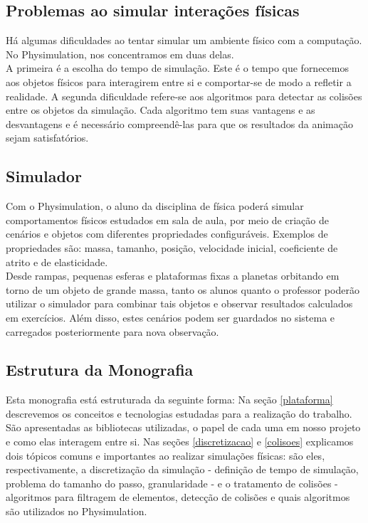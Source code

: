 \subsection{Problemas ao simular interações físicas}
Há algumas dificuldades ao tentar simular um ambiente físico com a computação. No Physimulation, nos concentramos em duas delas.\\

A primeira é a escolha do tempo de simulação. Este é o tempo que fornecemos aos objetos físicos para interagirem entre si e comportar-se de modo a refletir a realidade. A segunda dificuldade refere-se aos algoritmos para detectar as colisões entre os objetos da simulação. Cada algoritmo tem suas vantagens e as desvantagens e é necessário compreendê-las para que os resultados da animação sejam satisfatórios.

\subsection{Simulador}
Com o Physimulation, o aluno da disciplina de física poderá simular comportamentos físicos estudados em sala de aula, por meio de criação de cenários e objetos com diferentes propriedades configuráveis. Exemplos de propriedades são: massa, tamanho, posição, velocidade inicial, coeficiente de atrito e de elasticidade. \\

Desde rampas, pequenas esferas e plataformas fixas a planetas orbitando em torno de um objeto de grande massa, tanto os alunos quanto o professor poderão utilizar o simulador para combinar tais objetos e observar resultados calculados em exercícios. Além disso, estes cenários podem ser guardados no sistema e carregados posteriormente para nova observação.

\subsection{Estrutura da Monografia}
Esta monografia está estruturada da seguinte forma: Na seção \ref{plataforma} descrevemos os conceitos e tecnologias estudadas para a realização do trabalho. São apresentadas as bibliotecas utilizadas, o papel de cada uma em nosso projeto e como elas interagem entre si. Nas seções \ref{discretizacao} e \ref{colisoes} explicamos dois tópicos comuns e importantes ao realizar simulações físicas: são eles, respectivamente, a discretização da simulação - definição de tempo de simulação, problema do tamanho do passo, granularidade - e o tratamento de colisões - algoritmos para filtragem de elementos, detecção de colisões e quais algoritmos são utilizados no Physimulation.  \\

